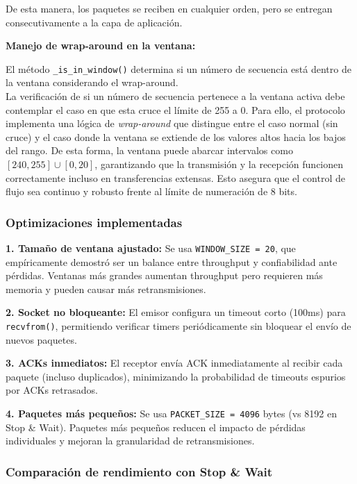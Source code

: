 De esta manera, los paquetes se reciben en cualquier orden, pero se entregan consecutivamente a la capa de aplicación.

\textbf{Manejo de wrap-around en la ventana:}

El método \texttt{\_is\_in\_window()} determina si un número de secuencia está dentro de la ventana considerando el wrap-around.
\\

La verificación de si un número de secuencia pertenece a la ventana activa debe contemplar el caso en que esta cruce el límite de 255 a 0. Para ello, el protocolo implementa una lógica de \textit{wrap-around} que distingue entre el caso normal (sin cruce) y el caso donde la ventana se extiende de los valores altos hacia los bajos del rango.  
De esta forma, la ventana puede abarcar intervalos como \([240, 255] \cup [0, 20]\), garantizando que la transmisión y la recepción funcionen correctamente incluso en transferencias extensas. Esto asegura que el control de flujo sea continuo y robusto frente al límite de numeración de 8 bits.


\subsubsection{Optimizaciones implementadas}

\textbf{1. Tamaño de ventana ajustado:}
Se usa \texttt{WINDOW\_SIZE = 20}, que empíricamente demostró ser un balance entre throughput y confiabilidad ante pérdidas. Ventanas más grandes aumentan throughput pero requieren más memoria y pueden causar más retransmisiones.

\textbf{2. Socket no bloqueante:}
El emisor configura un timeout corto (100ms) para \texttt{recvfrom()}, permitiendo verificar timers periódicamente sin bloquear el envío de nuevos paquetes.

\textbf{3. ACKs inmediatos:}
El receptor envía ACK inmediatamente al recibir cada paquete (incluso duplicados), minimizando la probabilidad de timeouts espurios por ACKs retrasados.

\textbf{4. Paquetes más pequeños:}
Se usa \texttt{PACKET\_SIZE = 4096} bytes (vs 8192 en Stop \& Wait). Paquetes más pequeños reducen el impacto de pérdidas individuales y mejoran la granularidad de retransmisiones.

\subsubsection{Comparación de rendimiento con Stop \& Wait}

